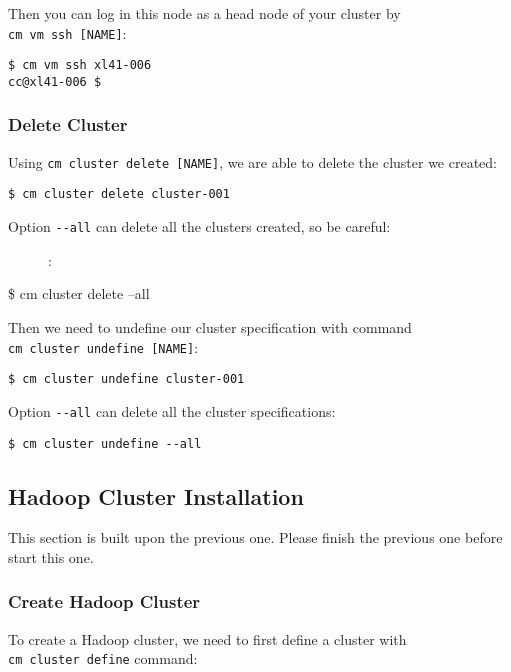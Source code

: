 Then you can log in this node as a head node of your cluster by
\texttt{cm\ vm\ ssh\ {[}NAME{]}}:

\begin{verbatim}
$ cm vm ssh xl41-006
cc@xl41-006 $
\end{verbatim}

\subsubsection{Delete Cluster}\label{delete-cluster}

Using \texttt{cm\ cluster\ delete\ {[}NAME{]}}, we are able to delete
the cluster we created:

\begin{verbatim}
$ cm cluster delete cluster-001
\end{verbatim}

\begin{description}
\item[Option \texttt{-\/-all} can delete all the clusters created, so be
careful:]
:
\end{description}

\$ cm cluster delete --all

Then we need to undefine our cluster specification with command
\texttt{cm\ cluster\ undefine\ {[}NAME{]}}:

\begin{verbatim}
$ cm cluster undefine cluster-001
\end{verbatim}

Option \texttt{-\/-all} can delete all the cluster specifications:

\begin{verbatim}
$ cm cluster undefine --all
\end{verbatim}

\subsection{Hadoop Cluster
Installation}\label{hadoop-cluster-installation}

This section is built upon the previous one. Please finish the previous
one before start this one.

\subsubsection{Create Hadoop Cluster}\label{create-hadoop-cluster}

To create a Hadoop cluster, we need to first define a cluster with
\texttt{cm\ cluster\ define} command:

